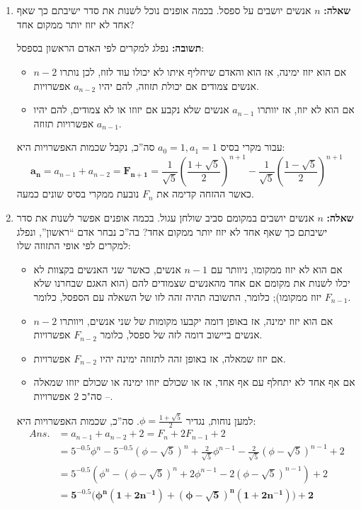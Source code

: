 \documentclass[]{article}
\newcommand\ans   {\mathit{Ans.}}
\newcommand\cl [1]    {\left ( #1 \right )}
\newcommand\ano       {a_{n - 1}}
\begin{document}
	\section{} %
	
	\begin{enumerate}
		\item \textbf{שאלה: }$n$ אנשים יושבים על ספסל. בכמה אופנים נוכל לשנות את סדר ישיבתם כך שאף אחד לא יזוז יותר ממקום אחד? 
		
		\textbf{תשובה: }נפלג למקרים לפי האדם הראשון בספסל: 
		\begin{itemize}
			\item אם הוא יזוז ימינה, אז הוא והאדם שיחליף איתו לא יכולו עוד לזוז, לכן נותרו $n - 2$ אנשים צמודים אם יכולת תזוזה, להם יהיו $a_{n - 2}$ אפשרויות. 
			\item אם הוא לא יזוז, אז יוותרו $a_{n - 1}$ אנשים שלא נקבע אם יזוזו או לא צמודים, להם יהיו $\ano$ אפשרויות תזוזה. 
		\end{itemize}
		עבור מקרי בסיס $a_0 = 1, a_1 = 1 $
		סה''כ, נקבל שכמות האפשרויות היא: 
		\[ \bm{a_n} = a_{n - 1} + a_{n - 2} = \bm{F_{n + 1}} = \frac{1}{\sqrt5}\cl{\frac{1 + \sqrt{5}}{2}}^{n + 1} - \frac{1}{\sqrt5} \cl{\frac{1 - \sqrt5}{2}}^{n + 1} \]
		כאשר ההזחה קדימה את $F_n$ נובעת ממקרי בסיס שונים כמעה. 
		\item \textbf{שאלה: }$n$ אנשים יושבים במקומם סביב שולחן עגול. בכמה אופנים אפשר לשנות את סדר ישיבתם כך שאף אחד לא יזוז יותר ממקום אחד?
		בה''כ נבחר אדם ``ראשון'', ונפלג למקרים לפי אופי התזוזה שלו: 
		\begin{itemize}
			\item אם הוא לא יזוז ממקומו, ניוותר עם $n - 1$ אנשים, כאשר שני האנשים בקצוות לא יכלו לשנות את מקומם אם אחד מהאנשים שצמודים להם (הוא האגם שבחרנו שלא יזוז ממקומו); כלומר, התשובה תהיה זהה לזו של השאלה עם הספסל, כלומר $F_{n - 1}$. 
			\item אם הוא יזוז ימינה, אז באופן דומה יקבעו מקומות של שני אנשים, ויוותרו $n - 2$ אנשים ביישוב דומה לזה של ספסל, כלומר $F_{n - 2}$ אפשרויות. 
			\item אם יזוז שמאלה, אז באופן זהה לתזוזה ימינה יהיו $F_{n - 2}$ אפשרויות. 
			\item אם אף אחד לא יתחלף עם אף אחד, אז או שכולם יזוזו ימינה או שכולם יזוזו שמאלה – סה"כ $2$ אפשרויות. 
		\end{itemize}
		
		למען נוחות, נגדיר $\phi=  \frac{1 + \sqrt 5}{2}$. 
		סה''כ, שכמות האפשרויות היא: 
		\begin{align*}
			\ans &= a_{n - 1} + a_{n - 2} + 2 = F_{n} + 2F_{n - 1} + 2 \\
			     &= 5^{-0.5}\phi^{n} - 5^{-0.5}(\phi - \sqrt5)^{n} + \frac{2}{\sqrt5}\phi^{n - 1} - \frac{2}{\sqrt5}(\phi - \sqrt5)^{n - 1} + 2 \\
			     &= 5^{-0.5}(\phi^{n} - (\phi - \sqrt5)^{n} + 2\phi^{n - 1} - 2 (\phi - \sqrt5)^{n - 1}) + 2 \\
			     &= \bm{5^{-0.5}\big(\phi^{n}\cl{1 + 2n^{-1}} + (\phi - \sqrt5)^{n}\cl{1 + 2n^{-1}}\big) + 2}
		\end{align*}
	\end{enumerate}
	
\end{document}
